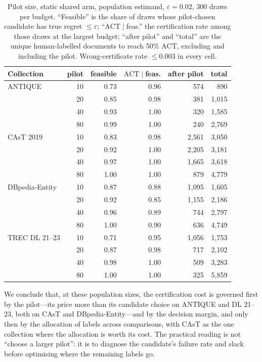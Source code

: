 \documentclass{article}
\newcommand{\eps}{\varepsilon}
\newcommand{\ACT}{\mathrm{ACT}}
\begin{document}
\begin{table}[h]\centering\scriptsize\setlength{\tabcolsep}{3pt}
\caption{Pilot size, static shared arm, population estimand, $\eps=0.02$, 300 draws per budget. ``Feasible'' is the share of draws whose pilot-chosen candidate has true regret $\le\eps$; ``$\ACT\mid$feas.'' the certification rate among those draws at the largest budget; ``after pilot'' and ``total'' are the unique human-labelled documents to reach 50\% $\ACT$, excluding and including the pilot. Wrong-certificate rate $\le0.003$ in every cell.}\label{tab:pilot}
\begin{tabular}{lrrrrr}\toprule
Collection & pilot & feasible & $\ACT\mid$feas. & after pilot & total\\\midrule
ANTIQUE & 10 & 0.73 & 0.96 & 574 & 890\\
 & 20 & 0.85 & 0.98 & 381 & 1{,}015\\
 & 40 & 0.93 & 1.00 & 320 & 1{,}585\\
 & 80 & 0.99 & 1.00 & 240 & 2{,}769\\
\midrule
CAsT 2019 & 10 & 0.83 & 0.98 & 2{,}561 & 3{,}050\\
 & 20 & 0.92 & 1.00 & 2{,}205 & 3{,}181\\
 & 40 & 0.97 & 1.00 & 1{,}665 & 3{,}618\\
 & 80 & 1.00 & 1.00 & 879 & 4{,}779\\
\midrule
DBpedia-Entity & 10 & 0.87 & 0.88 & 1{,}095 & 1{,}605\\
 & 20 & 0.92 & 0.85 & 1{,}155 & 2{,}186\\
 & 40 & 0.96 & 0.89 & 744 & 2{,}797\\
 & 80 & 1.00 & 0.90 & 636 & 4{,}749\\
\midrule
TREC DL 21--23 & 10 & 0.71 & 0.95 & 1{,}056 & 1{,}753\\
 & 20 & 0.87 & 0.98 & 717 & 2{,}102\\
 & 40 & 0.98 & 1.00 & 509 & 3{,}283\\
 & 80 & 1.00 & 1.00 & 325 & 5{,}859\\\bottomrule
\end{tabular}
\end{table}

We conclude that, at these population sizes, the certification cost is governed first by the pilot---its price more than its candidate choice on ANTIQUE and DL 21--23, both on CAsT and DBpedia-Entity---and by the decision margin, and only then by the allocation of labels across comparisons, with CAsT as the one collection where the allocation is worth its cost. The practical reading is not ``choose a larger pilot'': it is to diagnose the candidate's failure rate and slack before optimising where the remaining labels go.
\end{document}
